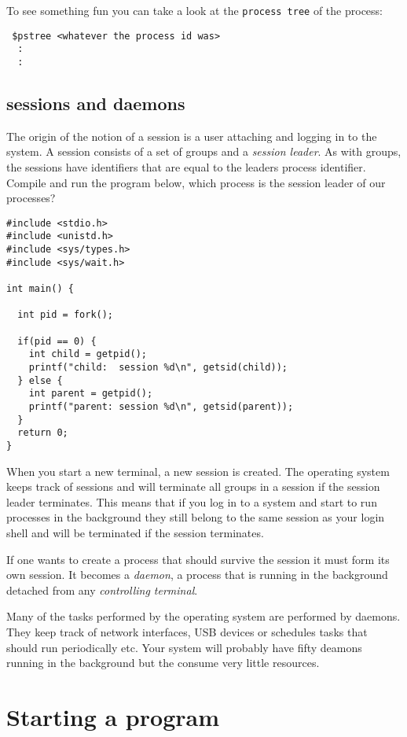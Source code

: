 \documentclass[a4paper,11pt]{article}
\begin{document}
To see something fun you can take a look at the {\tt process tree} of
the process:

\begin{verbatim}
 $pstree <whatever the process id was>
  :
  :
\end{verbatim}


\subsection{sessions and daemons}

The origin of the notion of a session is a user attaching and logging
in to the system. A session consists of a set of groups and a {\em
  session leader}. As with groups, the sessions have identifiers that
are equal to the leaders process identifier.  Compile and run the
program below, which process is the session leader of our processes?

\begin{lstlisting}
#include <stdio.h>
#include <unistd.h>
#include <sys/types.h>
#include <sys/wait.h>

int main() {

  int pid = fork();

  if(pid == 0) {
    int child = getpid();
    printf("child:  session %d\n", getsid(child));
  } else {
    int parent = getpid();
    printf("parent: session %d\n", getsid(parent));    
  }
  return 0;
}
\end{lstlisting}

When you start a new terminal, a new session is created. The operating
system keeps track of sessions and will terminate all groups in a
session if the session leader terminates. This means that if you log
in to a system and start to run processes in the background they still
belong to the same session as your login shell and will be terminated
if the session terminates.

If one wants to create a
process that should survive the session it must form its own
session. It becomes a {\em daemon}, a process that is running in the
background detached from any {\em controlling terminal}.

Many of the tasks performed by the operating system are performed by
daemons. They keep track of network interfaces, USB devices or
schedules tasks that should run periodically etc. Your system will
probably have fifty deamons running in the background
but the consume very little resources.


\section{Starting a program}
\end{document}
